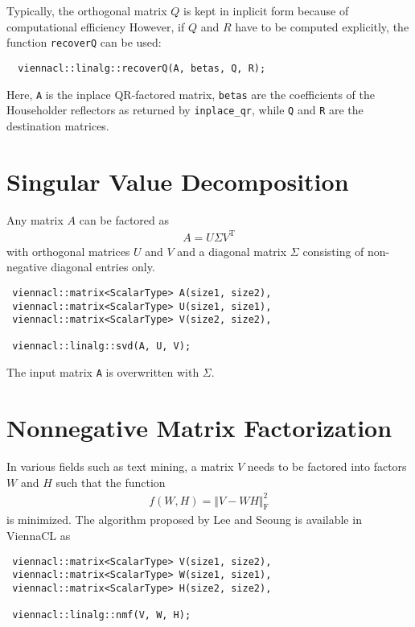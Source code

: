 Typically, the orthogonal matrix $Q$ is kept in inplicit form because of computational efficiency
However, if $Q$ and $R$ have to be computed explicitly, the function \lstinline|recoverQ| can be used:
\begin{lstlisting}
  viennacl::linalg::recoverQ(A, betas, Q, R); 
\end{lstlisting}
Here, \lstinline|A| is the inplace QR-factored matrix, \lstinline|betas| are the coefficients of the Householder reflectors as returned by
\lstinline|inplace_qr|, while \lstinline|Q| and \lstinline|R| are the destination matrices.


\section{Singular Value Decomposition}


Any matrix $A$ can be factored as
\begin{align}
 A = U \Sigma V^{\mathrm{T}}
\end{align}
with orthogonal matrices $U$ and $V$ and a diagonal matrix $\Sigma$ consisting of non-negative diagonal entries only.

\begin{lstlisting}
 viennacl::matrix<ScalarType> A(size1, size2),
 viennacl::matrix<ScalarType> U(size1, size1),
 viennacl::matrix<ScalarType> V(size2, size2),

 viennacl::linalg::svd(A, U, V);
\end{lstlisting}
The input matrix \lstinline|A| is overwritten with $\Sigma$.

\section{Nonnegative Matrix Factorization}

In various fields such as text mining, a matrix $V$ needs to be factored into factors $W$ and $H$ such that the function
\begin{align*}
 f(W, H) = \Vert V - WH \Vert_{\mathrm{F}}^2
\end{align*}
is minimized. The algorithm proposed by Lee and Seoung \cite{lee:nmf} is available in ViennaCL as
\begin{lstlisting}
 viennacl::matrix<ScalarType> V(size1, size2),
 viennacl::matrix<ScalarType> W(size1, size1),
 viennacl::matrix<ScalarType> H(size2, size2),

 viennacl::linalg::nmf(V, W, H);
\end{lstlisting}
